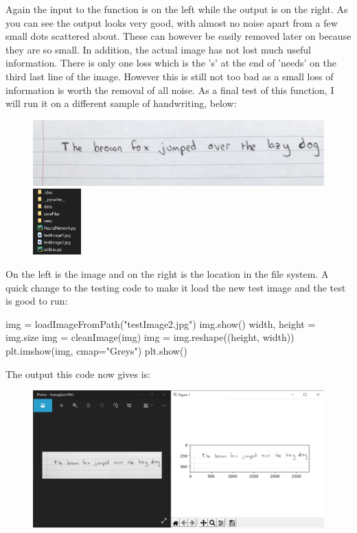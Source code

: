 \documentclass{report}
\begin{document}
\noindent Again the input to the function is on the left while the output is on the right. As you can see the output looks very good, with almost no noise apart from a few small dots scattered about. These can however be easily removed later on because they are so small. In addition, the actual image has not lost much useful information. There is only one loss which is the 's' at the end of 'needs' on the third last line of the image. However this is still not too bad as a small loss of information is worth the removal of all noise.
\newline
As a final test of this function, I will run it on a different sample of handwriting, below:
\begin{figure}[H]
    \centering
    \includegraphics[height=1in]{Images/Development and Testing/Stage 4/Testing for Clean Image/testImage2.jpg}
    \includegraphics[height=1in]{Images/Development and Testing/Stage 4/Testing for Clean Image/ProofOfTestImage2.png}
    \label{fig:Final Test data for Clean Image}
\end{figure}
\noindent On the left is the image and on the right is the location in the file system.
\newline
A quick change to the testing code to make it load the new test image and the test is good to run:
\begin{python}
img = loadImageFromPath("testImage2.jpg")
img.show()
width, height = img.size
img = cleanImage(img)
img = img.reshape((height, width))
plt.imshow(img, cmap="Greys")
plt.show()
\end{python}
The output this code now gives is:
\begin{figure}[H]
    \centering
    \includegraphics[width=5in]{Images/Development and Testing/Stage 4/Testing for Clean Image/Test 4, Did not work.png}
    \label{fig:Testing Clean Image: Test 4}
\end{figure}
\end{document}
